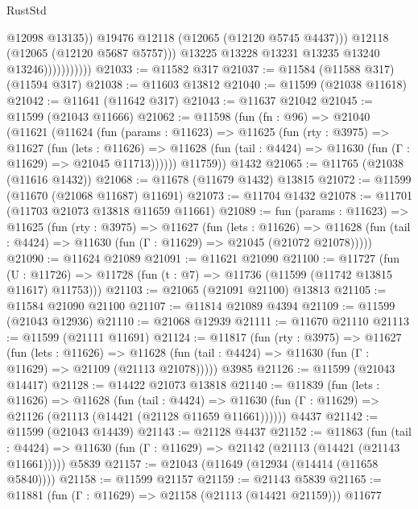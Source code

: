 \begin{lexlean}{RustStd}
\begin{coremodule}
                                  @12098
                                  @13135))
                              @19476
                              @12118
                              (@12065 (@12120 @5745 @4437)))
                            @12118
                            (@12065 (@12120 @5687 @5757)))
                          @13225
                          @13228
                          @13231
                          @13235
                          @13240
                          @13246)))))))))))
@21033 := @11582 @317
@21037 := @11584 (@11588 @317) (@11594 @317)
@21038 := @11603 @13812
@21040 := @11599 (@21038 @11618)
@21042 := @11641 (@11642 @317)
@21043 := @11637 @21042
@21045 := @11599 (@21043 @11666)
@21062 := @11598
    (fun (fn : @96) =>
    @21040
      (@11621
        (@11624
          (fun (params : @11623) =>
          @11625
            (fun (rty : @3975) =>
            @11627
              (fun (lets : @11626) =>
              @11628 (fun (tail : @4424) => @11630 (fun (Γ : @11629) => @21045 @11713))))))
        @11759))
    @1432
@21065 := @11765 (@21038 (@11616 @1432))
@21068 := @11678 (@11679 @1432) @13815
@21072 := @11599 (@11670 (@21068 @11687) @11691)
@21073 := @11704 @1432
@21078 := @11701 (@11703 @21073 @13818 @11659 @11661)
@21089 := fun (params : @11623) =>
  @11625
    (fun (rty : @3975) =>
    @11627
      (fun (lets : @11626) =>
      @11628 (fun (tail : @4424) => @11630 (fun (Γ : @11629) => @21045 (@21072 @21078)))))
@21090 := @11624 @21089
@21091 := @11621 @21090
@21100 := @11727
    (fun (U : @11726) => @11728 (fun (t : @7) => @11736 (@11599 (@11742 @13815 @11617) @11753)))
@21103 := @21065 (@21091 @21100) @13813
@21105 := @11584 @21090 @21100
@21107 := @11814 @21089 @4394
@21109 := @11599 (@21043 @12936)
@21110 := @21068 @12939
@21111 := @11670 @21110
@21113 := @11599 (@21111 @11691)
@21124 := @11817
    (fun (rty : @3975) =>
    @11627
      (fun (lets : @11626) =>
      @11628 (fun (tail : @4424) => @11630 (fun (Γ : @11629) => @21109 (@21113 @21078)))))
    @3985
@21126 := @11599 (@21043 @14417)
@21128 := @14422 @21073 @13818
@21140 := @11839
    (fun (lets : @11626) =>
    @11628
      (fun (tail : @4424) =>
      @11630 (fun (Γ : @11629) => @21126 (@21113 (@14421 (@21128 @11659 @11661))))))
    @4437
@21142 := @11599 (@21043 @14439)
@21143 := @21128 @4437
@21152 := @11863
    (fun (tail : @4424) => @11630 (fun (Γ : @11629) => @21142 (@21113 (@14421 (@21143 @11661)))))
    @5839
@21157 := @21043 (@11649 (@12934 (@14414 (@11658 @5840))))
@21158 := @11599 @21157
@21159 := @21143 @5839
@21165 := @11881 (fun (Γ : @11629) => @21158 (@21113 (@14421 @21159))) @11677

\end{coremodule}
\end{lexlean}
